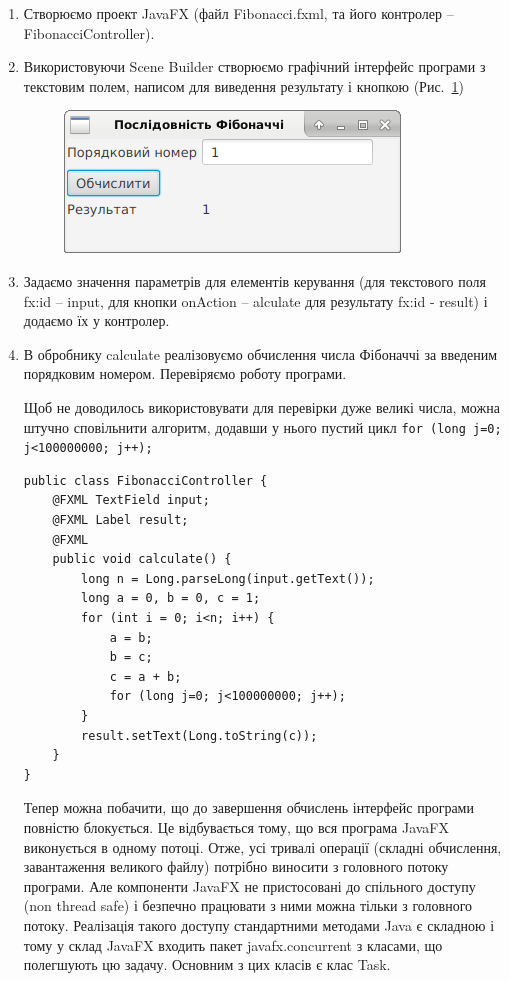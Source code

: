 \begin{enumerate}
	\item Створюємо проект JavaFX (файл Fibonacci.fxml, та його контролер – FibonacciController).

	\item Використовуючи Scene Builder створюємо графічний інтерфейс програми з текстовим полем, написом для виведення результату і кнопкою (Рис.~\ref{fig:image2})
\begin{figure}[h]
	\includegraphics{chapter21/images/image2.png}
	\caption{}
	\label{fig:image2}
\end{figure}

	\item Задаємо значення параметрів для елементів керування (для текстового поля fx:id – input, для кнопки onAction – alculate для результату fx:id - result) і додаємо їх у контролер.

	\item В обробнику calculate реалізовуємо обчислення числа Фібоначчі за введеним порядковим номером. Перевіряємо роботу програми.

	Щоб не доводилось використовувати для перевірки дуже великі числа, можна штучно сповільнити алгоритм, додавши у нього пустий цикл
	\texttt{for (long j=0; j<100000000; j++);}

\begin{verbatim}
public class FibonacciController {
	@FXML TextField input;
	@FXML Label result;
	@FXML
	public void calculate() {
		long n = Long.parseLong(input.getText());
		long a = 0, b = 0, c = 1;
		for (int i = 0; i<n; i++) {
			a = b;
			b = c;
			c = a + b;
			for (long j=0; j<100000000; j++);
		}
		result.setText(Long.toString(c));
	}
}
\end{verbatim}

Тепер можна побачити, що до завершення обчислень інтерфейс програми повністю блокується. 
Це відбувається тому, що вся програма JavaFX виконується в одному потоці. Отже, усі тривалі операції (складні обчислення, завантаження великого файлу) потрібно виносити з головного потоку програми. Але компоненти JavaFX не пристосовані до спільного доступу (non thread safe) і безпечно працювати з ними можна тільки з головного потоку. Реалізація такого доступу стандартними методами Java є складною і тому у склад JavaFX входить пакет javafx.concurrent з класами, що полегшують цю задачу. Основним з цих класів є клас Task. 


\end{enumerate}
